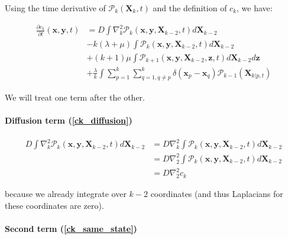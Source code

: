 Using the time derivative of $\mathcal{P}_{k}(\boldsymbol{X}_{k},t)$ and
the definition of $c_{k}$, we have:

\begin{subequations} 
\begin{align}
\frac{\partial c_{k}}{\partial t}(\boldsymbol{x},\boldsymbol{y},t) & =D\int\nabla_{k}^{2}\mathcal{P}_{k}(\boldsymbol{x},\boldsymbol{y},\boldsymbol{X}_{k-2},t)d\boldsymbol{X}_{k-2}\label{ck_diffusion}\\
 & -k(\lambda+\mu)\int\mathcal{P}_{k}(\boldsymbol{x},\boldsymbol{y},\boldsymbol{X}_{k-2},t)d\boldsymbol{X}_{k-2}\label{ck_same_state}\\
 & +(k+1)\mu\int\mathcal{P}_{k+1}(\boldsymbol{x},\boldsymbol{y},\boldsymbol{X}_{k-2},\boldsymbol{z},t)d\boldsymbol{X}_{k-2}d\boldsymbol{z}\label{ck_death}\\
 & +\frac{\lambda}{k}\int\sum_{p=1}^{k}\sum_{q=1,q\neq p}^{k}\delta({\boldsymbol{x}_p-\boldsymbol{x}_q})\mathcal{P}_{k-1}(\boldsymbol{X}_{k|p,t})\label{ck_birth}
\end{align}
\end{subequations}

We will treat one term after the other. \\


\paragraph*{Diffusion term (\ref{ck_diffusion})}

\begin{subequations} 
\begin{align}
D\int\nabla_{k}^{2}\mathcal{P}_{k}(\boldsymbol{x},\boldsymbol{y},\boldsymbol{X}_{k-2},t)d\boldsymbol{X}_{k-2} & =D\nabla_{k}^{2}\int\mathcal{P}_{k}(\boldsymbol{x},\boldsymbol{y},\boldsymbol{X}_{k-2},t)d\boldsymbol{X}_{k-2}\\
 & =D\nabla_{2}^{2}\int\mathcal{P}_{k}(\boldsymbol{x},\boldsymbol{y},\boldsymbol{X}_{k-2},t)d\boldsymbol{X}_{k-2}\\
 & =D\nabla_{2}^{2}c_{k}\label{diffusion_term_deriv}
\end{align}
\end{subequations}

because we already integrate over $k-2$ coordinates (and thus Laplacians for these coordinates are zero).

\paragraph*{Second term (\ref{ck_same_state})}


